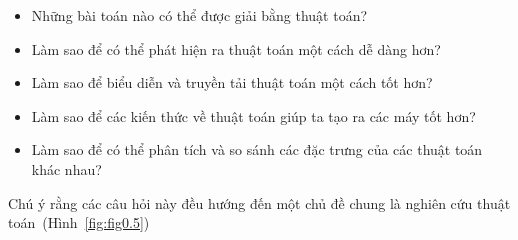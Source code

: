\begin{itemize}
\item Những bài toán nào có thể được giải bằng thuật toán?

\item Làm sao để có thể phát hiện ra thuật toán một cách dễ dàng hơn?

\item Làm sao để biểu diễn và truyền tải thuật toán một cách tốt
  hơn?

\item Làm sao để các kiến thức về thuật toán giúp ta tạo ra
  các máy tốt hơn?

\item Làm sao để có thể phân tích và so sánh các đặc trưng 
  của các thuật toán khác nhau?
\end{itemize}

Chú ý rằng các câu hỏi này đều hướng đến một chủ đề chung là nghiên
cứu thuật toán~(Hình~\ref{fig:fig0.5})




